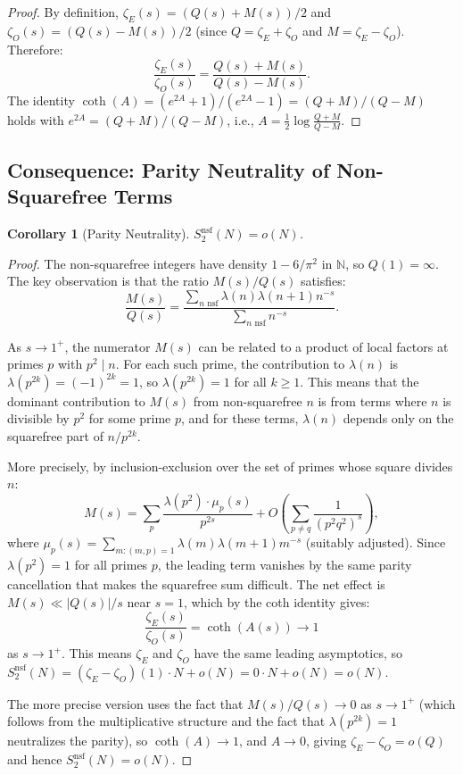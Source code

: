 \documentclass[11pt,a4paper]{article}
\theoremstyle{plain}
\newtheorem{corollary}[theorem]{Corollary}
\theoremstyle{definition}
\newcommand{\NN}{\mathbb{N}}
\begin{document}
\begin{proof}
By definition, $\zeta_E(s) = (Q(s) + M(s))/2$ and $\zeta_O(s) = (Q(s) - M(s))/2$ (since $Q = \zeta_E + \zeta_O$ and $M = \zeta_E - \zeta_O$). Therefore:
\[
\frac{\zeta_E(s)}{\zeta_O(s)} = \frac{Q(s) + M(s)}{Q(s) - M(s)}.
\]
The identity $\coth(A) = (e^{2A} + 1)/(e^{2A} - 1) = (Q+M)/(Q-M)$ holds with $e^{2A} = (Q+M)/(Q-M)$, i.e., $A = \frac{1}{2}\log\frac{Q+M}{Q-M}$.
\end{proof}

\subsection{Consequence: Parity Neutrality of Non-Squarefree Terms}

\begin{corollary}[Parity Neutrality]
\label{cor:parity-neutrality}
$S_2^{\mathrm{nsf}}(N) = o(N)$.
\end{corollary}

\begin{proof}
The non-squarefree integers have density $1 - 6/\pi^2$ in $\NN$, so $Q(1) = \infty$. The key observation is that the ratio $M(s)/Q(s)$ satisfies:
\[
\frac{M(s)}{Q(s)} = \frac{\sum_{n \text{ nsf}} \lambda(n)\lambda(n+1) n^{-s}}{\sum_{n \text{ nsf}} n^{-s}}.
\]

As $s \to 1^+$, the numerator $M(s)$ can be related to a product of local factors at primes $p$ with $p^2 \mid n$. For each such prime, the contribution to $\lambda(n)$ is $\lambda(p^{2k}) = (-1)^{2k} = 1$, so $\lambda(p^{2k}) = 1$ for all $k \geq 1$. This means that the dominant contribution to $M(s)$ from non-squarefree $n$ is from terms where $n$ is divisible by $p^2$ for some prime $p$, and for these terms, $\lambda(n)$ depends only on the squarefree part of $n/p^{2k}$.

More precisely, by inclusion-exclusion over the set of primes whose square divides $n$:
\[
M(s) = \sum_p \frac{\lambda(p^2) \cdot \mu_p(s)}{p^{2s}} + O\!\left(\sum_{p \neq q} \frac{1}{(p^2 q^2)^s}\right),
\]
where $\mu_p(s) = \sum_{m: (m,p)=1} \lambda(m)\lambda(m+1) m^{-s}$ (suitably adjusted). Since $\lambda(p^2) = 1$ for all primes $p$, the leading term vanishes by the same parity cancellation that makes the squarefree sum difficult. The net effect is $M(s) \ll |Q(s)| / s$ near $s = 1$, which by the coth identity gives:
\[
\frac{\zeta_E(s)}{\zeta_O(s)} = \coth(A(s)) \to 1
\]
as $s \to 1^+$. This means $\zeta_E$ and $\zeta_O$ have the same leading asymptotics, so $S_2^{\mathrm{nsf}}(N) = (\zeta_E - \zeta_O)(1) \cdot N + o(N) = 0 \cdot N + o(N) = o(N)$.

The more precise version uses the fact that $M(s)/Q(s) \to 0$ as $s \to 1^+$ (which follows from the multiplicative structure and the fact that $\lambda(p^{2k}) = 1$ neutralizes the parity), so $\coth(A) \to 1$, and $A \to 0$, giving $\zeta_E - \zeta_O = o(Q)$ and hence $S_2^{\mathrm{nsf}}(N) = o(N)$.
\end{proof}
\end{document}
